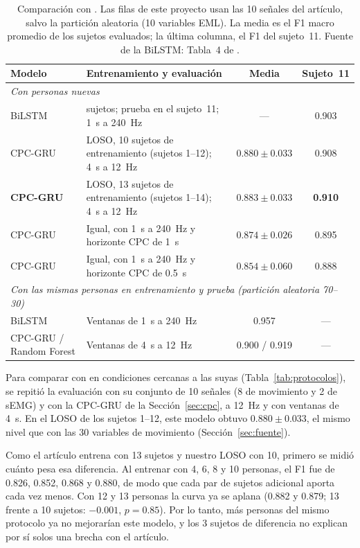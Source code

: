 \documentclass[letterpaper,11pt]{article}
\begin{document}
\begin{table}[H]
  \centering
  \small
  \caption{Comparación con \textcite{bassani2025}. Las filas de este proyecto usan las 10 señales del artículo, salvo la partición aleatoria (10 variables EML). La media es el F1 macro promedio de los sujetos evaluados; la última columna, el F1 del sujeto~11. Fuente de la BiLSTM: Tabla~4 de \textcite{bassani2025}.}
  \label{tab:bassani_resumen}
  \begin{tabular}{l>{\raggedright\arraybackslash}p{5.6cm}cc}
    \toprule
    Modelo & Entrenamiento y evaluación & Media & Sujeto~11 \\
    \midrule
    \multicolumn{4}{l}{\emph{Con personas nuevas}} \\
    BiLSTM \parencite{bassani2025} & 13 sujetos; prueba en el sujeto~11; 1~s a 240~Hz & --- & 0.903 \\
    CPC-GRU & LOSO, 10 sujetos de entrenamiento (sujetos 1--12); 4~s a 12~Hz & $0.880 \pm 0.033$ & 0.908 \\
    \textbf{CPC-GRU} & LOSO, 13 sujetos de entrenamiento (sujetos 1--14); 4~s a 12~Hz & $\mathbf{0.883} \pm 0.033$ & \textbf{0.910} \\
    CPC-GRU & Igual, con 1~s a 240~Hz y horizonte CPC de 1~s & $0.874 \pm 0.026$ & 0.895 \\
    CPC-GRU & Igual, con 1~s a 240~Hz y horizonte CPC de 0.5~s & $0.854 \pm 0.060$ & 0.888 \\
    \midrule
    \multicolumn{4}{l}{\emph{Con las mismas personas en entrenamiento y prueba (partición aleatoria 70--30)}} \\
    BiLSTM \parencite{bassani2025} & Ventanas de 1~s a 240~Hz & 0.957 & --- \\
    CPC-GRU / Random Forest & Ventanas de 4~s a 12~Hz & 0.900 / 0.919 & --- \\
    \bottomrule
  \end{tabular}
\end{table}

Para comparar con \textcite{bassani2025} en condiciones cercanas a las suyas (Tabla~\ref{tab:protocolos}), se repitió la evaluación con su conjunto de 10 señales (8 de movimiento y 2 de sEMG) y con la CPC-GRU de la Sección~\ref{sec:cpc}, a 12~Hz y con ventanas de 4~s. En el LOSO de los sujetos 1--12, este modelo obtuvo $0.880 \pm 0.033$, el mismo nivel que con las 30 variables de movimiento (Sección~\ref{sec:fuente}).

Como el artículo entrena con 13 sujetos y nuestro LOSO con 10, primero se midió cuánto pesa esa diferencia. Al entrenar con 4, 6, 8 y 10 personas, el F1 fue de 0.826, 0.852, 0.868 y 0.880, de modo que cada par de sujetos adicional aporta cada vez menos. Con 12 y 13 personas la curva ya se aplana (0.882 y 0.879; 13 frente a 10 sujetos: $-0.001$, $p = 0.85$). Por lo tanto, más personas del mismo protocolo ya no mejorarían este modelo, y los 3 sujetos de diferencia no explican por sí solos una brecha con el artículo.
\end{document}
